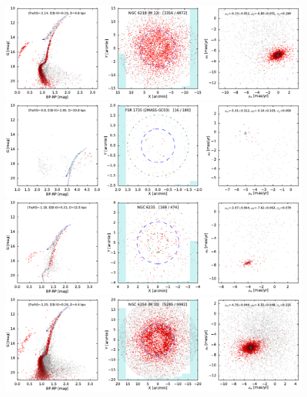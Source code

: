 \documentclass[usenatbib]{mnras}
\begin{document}
\clearpage\begin{figure}
\contcaption{}
\includegraphics{figs/NGC_6218_M_12.pdf}
\includegraphics{figs/FSR_1735.pdf}
\includegraphics{figs/NGC_6235.pdf}
\includegraphics{figs/NGC_6254_M_10.pdf}
\end{figure}
\end{document}
